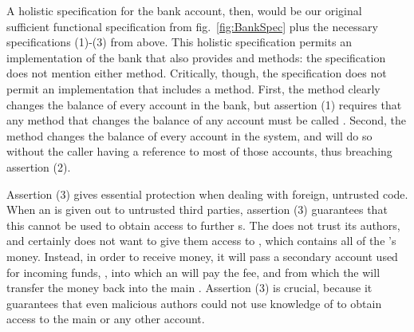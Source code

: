 A  holistic  specification for the bank account, then,
would be our original sufficient functional specification from
fig.~\ref{fig:BankSpec} plus the necessary
specifications (1)-(3) from above. %
This holistic specification
permits an implementation of the bank that also provides  
and  methods: the specification does not mention either method.
Critically, though, the \Chainmail specification
does not permit an
implementation that includes a  method.
First, the  method clearly changes the balance of
every account in the bank, but assertion (1) requires that any method
that changes the balance of any account must be called .
Second, the  method changes the balance of every account in
the system, and will do so without the caller having a reference to
most of those accounts, thus breaching assertion (2).   
 
Assertion (3) gives essential protection when dealing with foreign, untrusted code.
When an  is given out to untrusted third parties, assertion (3) guarantees that
this  cannot be used to obtain access to further  s. 
The  does not trust its authors, and certainly does not want
to give them access to , which contains all of
the 's money. Instead, in order to receive money, it will
pass a secondary account used for incoming funds, ,
into which an   will pay the fee, and from which the  will transfer the money
back into the main . Assertion (3) is crucial, because it guarantees that even 
malicious authors  could not use knowledge of   to obtain access to
the main  or any other account. %

